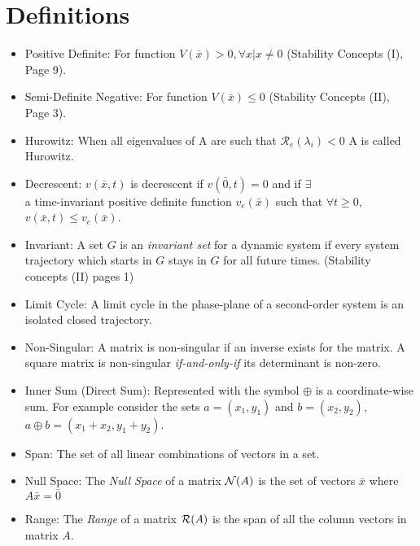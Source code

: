 \documentclass[12pt]{article}
\begin{document}
\section*{Definitions}

\begin{itemize}

\item Positive Definite: For function $V(\bar{x})>0, \forall x | x\neq0$ (Stability Concepts (I), Page 9).

\item Semi-Definite Negative: For function $V(\bar{x})\leq0$ (Stability Concepts (II), Page 3).

\item Hurowitz: When all eigenvalues of A are such that $\mathcal{R}_e(\lambda_i)<0$ A is called Hurowitz. 

\item Decrescent: $v(\bar{x},t)$ is decrescent if $v(\bar{0},t)=0$ and if $\exists$ \\ a time-invariant positive definite function $v_e(\bar{x})$ such that $\forall t\geq0$, $v(\bar{x},t)\leq v_e(\bar{x})$. 

\item Invariant: A set $G$ is an {\em invariant set} for a dynamic system if every system trajectory which starts in $G$ stays in $G$ for all future times. (Stability concepts (II) pages 1)

\item Limit Cycle: A limit cycle in the phase-plane of a second-order system is an isolated closed trajectory. 

\item Non-Singular: A matrix is non-singular if an inverse exists for the matrix. A square matrix is non-singular {\em if-and-only-if} its determinant is non-zero.

\item Inner Sum (Direct Sum): Represented with the symbol $\oplus$ is a coordinate-wise sum. For example consider the sets $a=(x_1,y_1)$ and $b=(x_2, y_2)$, $a\oplus b=(x_1+x_2,y_1+y_2)$.

\item Span: The set of all linear combinations of vectors in a set.

\item Null Space: The {\em Null Space} of a matrix ${\cal N}(A)$ is the set of vectors $\bar{x}$ where $A\bar{x}=\bar{0}$

\item Range: The {\em Range} of a matrix ${\cal R}(A)$ is the span of all the column vectors in matrix $A$.


\end{itemize}
\end{document}
